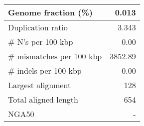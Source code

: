 \documentclass[12pt,a4paper]{article}
\begin{document}
\begin{table}[ht]
\begin{center}
\begin{tabular}{|l*{1}{|r}|}
Genome fraction (\%) & 0.013 \\ \hline
Duplication ratio & 3.343 \\ \hline
\# N's per 100 kbp & 0.00 \\ \hline
\# mismatches per 100 kbp & 3852.89 \\ \hline
\# indels per 100 kbp & 0.00 \\ \hline
Largest alignment & 128 \\ \hline
Total aligned length & 654 \\ \hline
NGA50 & - \\ \hline
\end{tabular}
\end{center}
\end{table}
\end{document}
